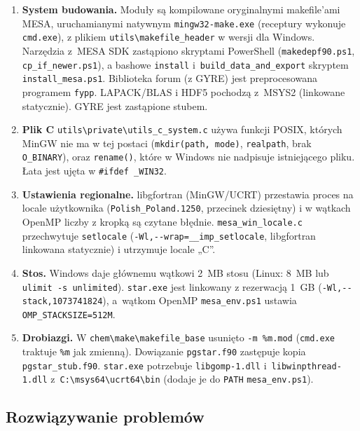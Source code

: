 \documentclass[11pt,a4paper]{article}
\begin{document}
\begin{enumerate}
\item \textbf{System budowania.} Moduły są kompilowane oryginalnymi makefile'ami MESA, uruchamianymi
  natywnym \texttt{mingw32-make.exe} (receptury wykonuje \texttt{cmd.exe}), z plikiem
  \verb!utils\makefile_header! w wersji dla Windows. Narzędzia z~MESA SDK zastąpiono skryptami
  PowerShell (\texttt{makedepf90.ps1}, \texttt{cp\_if\_newer.ps1}), a bashowe \texttt{install}
  i~\texttt{build\_data\_and\_export} skryptem \texttt{install\_mesa.ps1}. Biblioteka forum (z GYRE)
  jest preprocesowana programem \texttt{fypp}. LAPACK/BLAS i HDF5 pochodzą z~MSYS2 (linkowane
  statycznie). GYRE jest zastąpione stubem.
\item \textbf{Plik C} \verb!utils\private\utils_c_system.c! używa funkcji POSIX, których MinGW nie
  ma w tej postaci (\texttt{mkdir(path, mode)}, \texttt{realpath}, brak \texttt{O\_BINARY}), oraz
  \texttt{rename()}, które w Windows nie nadpisuje istniejącego pliku. Łata jest ujęta
  w \verb!#ifdef _WIN32!.
\item \textbf{Ustawienia regionalne.} libgfortran (MinGW/UCRT) przestawia proces na locale
  użytkownika (\texttt{Polish\_Poland.1250}, przecinek dziesiętny) i w wątkach OpenMP liczby z kropką
  są czytane błędnie. \texttt{mesa\_win\_locale.c} przechwytuje \texttt{setlocale}
  (\verb!-Wl,--wrap=__imp_setlocale!, libgfortran linkowana statycznie) i utrzymuje locale „C”.
\item \textbf{Stos.} Windows daje głównemu wątkowi 2~MB stosu (Linux: 8~MB lub
  \texttt{ulimit -s unlimited}). \texttt{star.exe} jest linkowany z rezerwacją 1~GB
  (\verb!-Wl,--stack,1073741824!), a~wątkom OpenMP \texttt{mesa\_env.ps1} ustawia
  \texttt{OMP\_STACKSIZE=512M}.
\item \textbf{Drobiazgi.} W \verb!chem\make\makefile_base! usunięto \verb!-m %m.mod!
  (\texttt{cmd.exe} traktuje \verb!%m! jak zmienną). Dowiązanie \texttt{pgstar.f90} zastępuje kopia
  \texttt{pgstar\_stub.f90}. \texttt{star.exe} potrzebuje \texttt{libgomp-1.dll}
  i~\texttt{libwinpthread-1.dll} z~\verb!C:\msys64\ucrt64\bin! (dodaje je do \texttt{PATH}
  \texttt{mesa\_env.ps1}).
\end{enumerate}

\subsection{Rozwiązywanie problemów}
\end{document}
